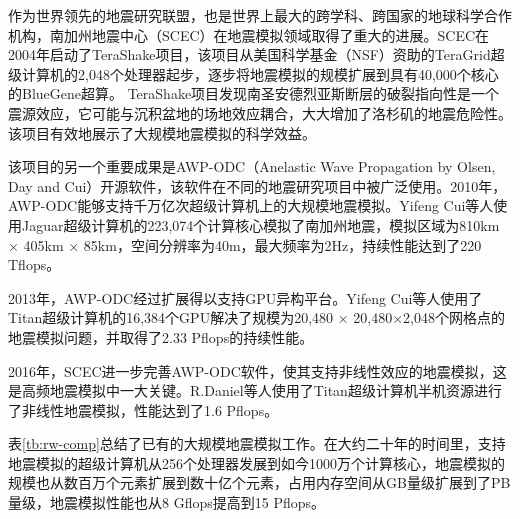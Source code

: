 作为世界领先的地震研究联盟，也是世界上最大的跨学科、跨国家的地球科学合作机构，南加州地震中心（SCEC）在地震模拟领域取得了重大的进展。SCEC在2004年启动了TeraShake项目，该项目从美国科学基金（NSF）资助的TeraGrid超级计算机\citep{teragrid}的2,048个处理器起步，逐步将地震模拟的规模扩展到具有40,000个核心的BlueGene超算\cite{adiga2002overview}。
TeraShake项目发现南圣安德烈亚斯断层的破裂指向性是一个震源效应，它可能与沉积盆地的场地效应耦合，大大增加了洛杉矶的地震危险性。该项目有效地展示了大规模地震模拟的科学效益。

该项目的另一个重要成果是AWP-ODC\cite{awpodc}（Anelastic Wave Propagation by Olsen, Day and Cui）开源软件，该软件在不同的地震研究项目中被广泛使用。2010年，AWP-ODC能够支持千万亿次超级计算机上的大规模地震模拟\citep{cui2010scalable}。Yifeng Cui等人使用Jaguar超级计算机的223,074个计算核心模拟了南加州地震，模拟区域为810km $\times$ 405km $\times$ 85km，空间分辨率为40m，最大频率为2Hz，持续性能达到了220 Tflops。

2013年，AWP-ODC经过扩展得以支持GPU异构平台。Yifeng Cui等人使用了Titan超级计算机的16,384个GPU解决了规模为20,480 $\times$ 20,480$\times$2,048个网格点的地震模拟问题，并取得了2.33 Pflops的持续性能。

2016年，SCEC进一步完善AWP-ODC软件，使其支持非线性效应的地震模拟，这是高频地震模拟中一大关键。R.Daniel等人使用了Titan超级计算机半机资源进行了非线性地震模拟\citep{roten2016high}，性能达到了1.6 Pflops。

表\ref{tb:rw-comp}总结了已有的大规模地震模拟工作。在大约二十年的时间里，支持地震模拟的超级计算机从256个处理器发展到如今1000万个计算核心，地震模拟的规模也从数百万个元素扩展到数十亿个元素，占用内存空间从GB量级扩展到了PB量级，地震模拟性能也从8 Gflops提高到15 Pflops。

